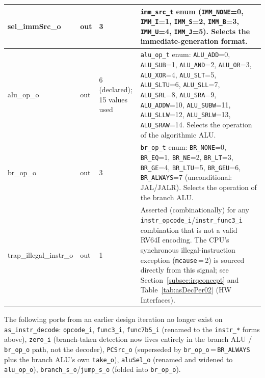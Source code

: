 \begin{table}[H]
\begin{tabularx}{\textwidth}{|l |l |l |X|}
  \hline
  sel\_immSrc\_o & out & 3 & \texttt{imm\_src\_t} enum (\texttt{IMM\_NONE}=0, \texttt{IMM\_I}=1, \texttt{IMM\_S}=2, \texttt{IMM\_B}=3, \texttt{IMM\_U}=4, \texttt{IMM\_J}=5). Selects the immediate-generation format. \\
  \hline
  alu\_op\_o & out & 6 (declared); 15 values used & \texttt{alu\_op\_t} enum: \texttt{ALU\_ADD}=0, \texttt{ALU\_SUB}=1, \texttt{ALU\_AND}=2, \texttt{ALU\_OR}=3, \texttt{ALU\_XOR}=4, \texttt{ALU\_SLT}=5, \texttt{ALU\_SLTU}=6, \texttt{ALU\_SLL}=7, \texttt{ALU\_SRL}=8, \texttt{ALU\_SRA}=9, \texttt{ALU\_ADDW}=10, \texttt{ALU\_SUBW}=11, \texttt{ALU\_SLLW}=12, \texttt{ALU\_SRLW}=13, \texttt{ALU\_SRAW}=14. Selects the operation of the algorithmic ALU. \\
  \hline
  br\_op\_o & out & 3 & \texttt{br\_op\_t} enum: \texttt{BR\_NONE}=0, \texttt{BR\_EQ}=1, \texttt{BR\_NE}=2, \texttt{BR\_LT}=3, \texttt{BR\_GE}=4, \texttt{BR\_LTU}=5, \texttt{BR\_GEU}=6, \texttt{BR\_ALWAYS}=7 (unconditional: JAL/JALR). Selects the operation of the branch ALU. \\
  \hline
  trap\_illegal\_instr\_o & out & 1 & Asserted (combinationally) for any \texttt{instr\_opcode\_i}/\texttt{instr\_func3\_i} combination that is not a valid RV64I encoding. The CPU's synchronous illegal-instruction exception (\texttt{mcause}\,=\,2) is sourced directly from this signal; see Section~\ref{subsec:irqconcept} and Table~\ref{tab:asDecPer02} (HW Interfaces). \\
  \hline
\end{tabularx}
\end{table}
\noindent\footnotesize The following ports from an earlier design
iteration no longer exist on \texttt{as\_instr\_decode}: \texttt{opcode\_i},
\texttt{func3\_i}, \texttt{func7b5\_i} (renamed to the \texttt{instr\_*}
forms above), \texttt{zero\_i} (branch-taken detection now lives entirely
in the branch ALU / \texttt{br\_op\_o} path, not the decoder),
\texttt{PCSrc\_o} (superseded by \texttt{br\_op\_o}\,=\,\texttt{BR\_ALWAYS}
plus the branch ALU's own \texttt{take\_o}), \texttt{aluSel\_o} (renamed
and widened to \texttt{alu\_op\_o}), \texttt{branch\_s\_o}/\texttt{jump\_s\_o}
(folded into \texttt{br\_op\_o}).\normalsize
